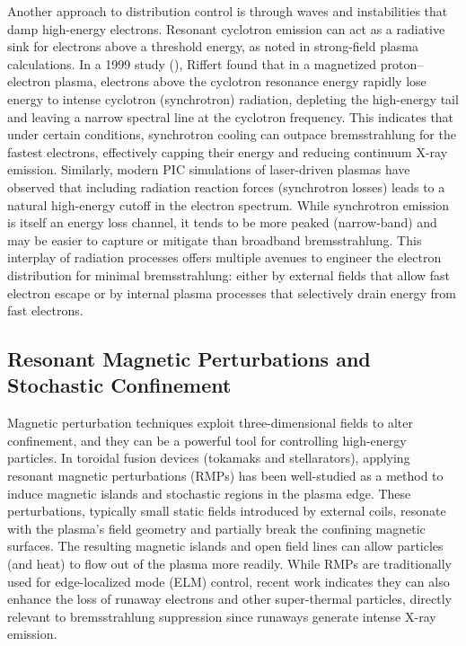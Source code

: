 \documentclass[12pt]{article}
\begin{document}
Another approach to distribution control is through waves and instabilities that damp high-energy electrons. Resonant cyclotron emission can act as a radiative sink for electrons above a threshold energy, as noted in strong-field plasma calculations. In a 1999 study (\cite{emissivity}), Riffert found that in a magnetized proton–electron plasma, electrons above the cyclotron resonance energy rapidly lose energy to intense cyclotron (synchrotron) radiation, depleting the high-energy tail and leaving a narrow spectral line at the cyclotron frequency. This indicates that under certain conditions, synchrotron cooling can outpace bremsstrahlung for the fastest electrons, effectively capping their energy and reducing continuum X-ray emission. Similarly, modern PIC simulations of laser-driven plasmas have observed that including radiation reaction forces (synchrotron losses) leads to a natural high-energy cutoff in the electron spectrum. While synchrotron emission is itself an energy loss channel, it tends to be more peaked (narrow-band) and may be easier to capture or mitigate than broadband bremsstrahlung. This interplay of radiation processes offers multiple avenues to engineer the electron distribution for minimal bremsstrahlung: either by external fields that allow fast electron escape or by internal plasma processes that selectively drain energy from fast electrons.

\subsection{Resonant Magnetic Perturbations and Stochastic Confinement}

Magnetic perturbation techniques exploit three-dimensional fields to alter confinement, and they can be a powerful tool for controlling high-energy particles. In toroidal fusion devices (tokamaks and stellarators), applying resonant magnetic perturbations (RMPs) has been well-studied as a method to induce magnetic islands and stochastic regions in the plasma edge. These perturbations, typically small static fields introduced by external coils, resonate with the plasma’s field geometry and partially break the confining magnetic surfaces. The resulting magnetic islands and open field lines can allow particles (and heat) to flow out of the plasma more readily. While RMPs are traditionally used for edge-localized mode (ELM) control, recent work indicates they can also enhance the loss of runaway electrons and other super-thermal particles, directly relevant to bremsstrahlung suppression since runaways generate intense X-ray emission.
\end{document}
